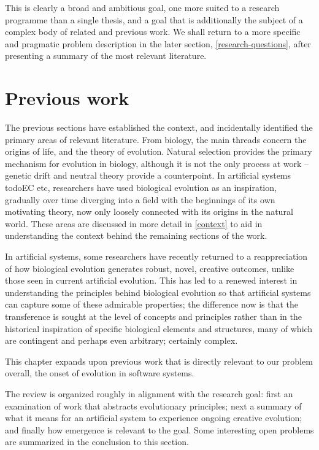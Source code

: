\documentclass[]{report}
\begin{document}
This is clearly a broad and ambitious goal, one more suited to a research programme than a single thesis, and a goal that is additionally the subject of a complex body of related and previous work. We shall return to a more specific and pragmatic problem description in the later section, \ref{research-questions}, after presenting a summary of the most relevant literature.

\section{Previous work}
The previous sections have established the context, and incidentally identified the primary areas of relevant literature. From biology, the main threads concern the origins of life, and the theory of evolution. Natural selection provides the primary mechanism for evolution in biology, although it is not the only process at work -- genetic drift \cite{XXX} and neutral theory \cite{Kimura} provide a counterpoint. In artificial systems \\todo{EC etc}, researchers have used biological evolution as an inspiration, gradually over time diverging into a field with the beginnings of its own motivating theory, now only loosely connected with its origins in the natural world. These areas are discussed in more detail in \ref{context} to aid in understanding the context behind the remaining sections of the work.

In artificial systems, some researchers have recently returned to a reappreciation of how biological evolution generates robust, novel, creative outcomes, unlike those seen in current artificial evolution. This has led to a renewed interest in understanding the principles behind biological evolution so that artificial systems can capture some of these admirable properties; the difference now is that the transference is sought at the level of concepts and principles rather than in the historical inspiration of specific biological elements and structures, many of which are contingent and perhaps even arbitrary; certainly complex.

This chapter expands upon previous work that is directly relevant to our problem overall, the onset of evolution in software systems. 

The review is organized roughly in alignment with the research goal: first an examination of work that abstracts evolutionary principles; next a summary of what it means for an artificial system to experience ongoing creative evolution; and finally how emergence is relevant to the goal. Some interesting open problems are summarized in the conclusion to this section.
\end{document}
